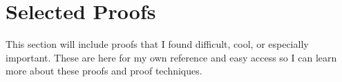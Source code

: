 \section{Selected Proofs}
This section will include proofs that I found difficult, cool, or especially important. These are here for my own reference and easy access so I can 
learn more about these proofs and proof techniques.

